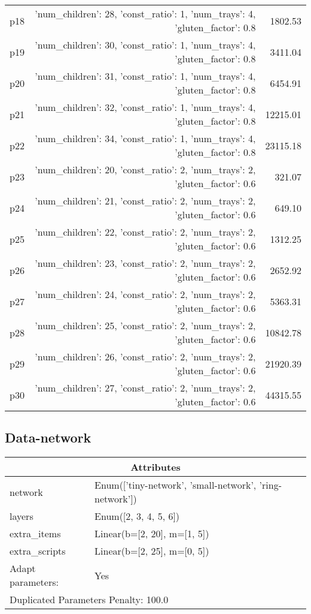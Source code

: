 \documentclass{article}
\begin{document}
\begin{center}
\begin{tabular}{@{}l|r|r@{}}
  p18&{'num\_children': 28, 'const\_ratio': 1, 'num\_trays': 4, 'gluten\_factor': 0.8}&1802.53\\
  p19&{'num\_children': 30, 'const\_ratio': 1, 'num\_trays': 4, 'gluten\_factor': 0.8}&3411.04\\
  p20&{'num\_children': 31, 'const\_ratio': 1, 'num\_trays': 4, 'gluten\_factor': 0.8}&6454.91\\
  p21&{'num\_children': 32, 'const\_ratio': 1, 'num\_trays': 4, 'gluten\_factor': 0.8}&12215.01\\
  p22&{'num\_children': 34, 'const\_ratio': 1, 'num\_trays': 4, 'gluten\_factor': 0.8}&23115.18\\
  p23&{'num\_children': 20, 'const\_ratio': 2, 'num\_trays': 2, 'gluten\_factor': 0.6}&321.07\\
  p24&{'num\_children': 21, 'const\_ratio': 2, 'num\_trays': 2, 'gluten\_factor': 0.6}&649.10\\
  p25&{'num\_children': 22, 'const\_ratio': 2, 'num\_trays': 2, 'gluten\_factor': 0.6}&1312.25\\
  p26&{'num\_children': 23, 'const\_ratio': 2, 'num\_trays': 2, 'gluten\_factor': 0.6}&2652.92\\
  p27&{'num\_children': 24, 'const\_ratio': 2, 'num\_trays': 2, 'gluten\_factor': 0.6}&5363.31\\
  p28&{'num\_children': 25, 'const\_ratio': 2, 'num\_trays': 2, 'gluten\_factor': 0.6}&10842.78\\
  p29&{'num\_children': 26, 'const\_ratio': 2, 'num\_trays': 2, 'gluten\_factor': 0.6}&21920.39\\
  p30&{'num\_children': 27, 'const\_ratio': 2, 'num\_trays': 2, 'gluten\_factor': 0.6}&44315.55
                            \end{tabular}
                            \end{center}
                    
                            \newpage \subsection{Data-network}
                    \begin{center}
                    \begin{tabular}{@{}p{}p{}@{}}
                    \multicolumn{2}{c}{\bf \large Attributes}\\\midrule
                    network & Enum(['tiny-network', 'small-network', 'ring-network'])\\
layers & Enum([2, 3, 4, 5, 6])\\
extra\_items & Linear(b=[2, 20], m=[1, 5])\\
extra\_scripts & Linear(b=[2, 25], m=[0, 5])
                    \\\midrule
                    Adapt parameters: & Yes \\\midrule
                    \multicolumn{2}{l}{Duplicated Parameters Penalty: 100.0}
                    \end{tabular}
                    \end{center}
                
\end{document}
